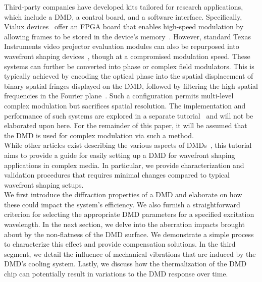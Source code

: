 \documentclass[12pt]{iopart}
\begin{document}
Third-party companies have developed kits tailored for research applications,
which include a DMD, a control board, and a software interface.
Specifically, Vialux devices~\cite{vialux} offer an FPGA board that enables high-speed modulation
by allowing frames to be stored in the device's memory~\cite{hofling2004alp}.
However, standard Texas Instruments video projector evaluation modules can also be repurposed into wavefront shaping devices~\cite{Cox2021converting},
though at a compromised modulation speed.
These systems can further be converted into phase or complex field modulators.
This is typically achieved by encoding the optical phase into
the spatial displacement of binary spatial fringes displayed on the DMD,
followed by filtering the high spatial frequencies in the Fourier plane~\cite{lee1979binary}.
Such a configuration permits multi-level complex modulation but sacrifices spatial resolution.
The implementation and performance of such systems are explored in a separate tutorial~\cite{Gutierrez2024DMD}
and will not be elaborated upon here.
For the remainder of this paper, it will be assumed that the DMD is used for complex modulation via such a method.\\

While other articles exist describing the various aspects of DMDs~\cite{Park2015properties, Scholes2019structured, Cox2021converting, Wang2023diffraction},
this tutorial aims to provide a guide for easily setting up a DMD for wavefront shaping applications in complex media.
In particular, we provide characterization and validation procedures that requires minimal changes compared to typical wavefront shaping setups.\\
We first introduce the diffraction properties of a DMD
and elaborate on how these could impact the system's efficiency.
We also furnish a straightforward criterion for selecting the appropriate DMD parameters for a specified excitation wavelength.
In the next section,
we delve into the aberration impacts brought about by the non-flatness of the DMD surface.
We demonstrate a simple process to characterize this effect and provide compensation solutions.
In the third segment,
we detail the influence of mechanical vibrations that are induced by the DMD's cooling system.
Lastly, we discuss how the thermalization of the DMD chip can potentially result in variations to the DMD response over time.
\end{document}
